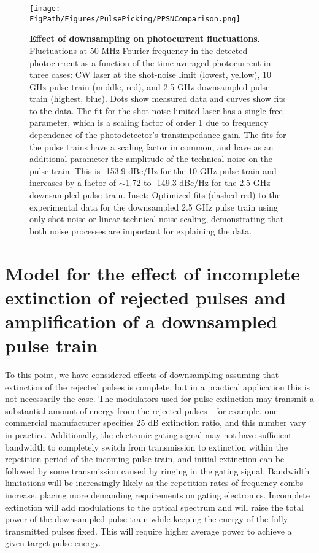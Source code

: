 \begin{figure}[htpb]
	\begin{center}
		\texttt{[image: \\FigPath/Figures/PulsePicking/PPSNComparison.png]}
	\end{center}
	\caption[Effect of downsampling on photocurrent fluctuations]{\textbf{Effect of downsampling on photocurrent fluctuations.} Fluctuations at 50 MHz Fourier frequency in the detected photocurrent as a function of the time-averaged photocurrent in three cases: CW laser at the shot-noise limit (lowest, yellow), 10 GHz pulse train (middle, red), and 2.5 GHz downsampled pulse train (highest, blue). Dots show measured data and curves show fits to the data. The fit for the shot-noise-limited laser has a single free parameter, which is a scaling factor of order 1 due to frequency dependence of the photodetector's transimpedance gain. The fits for the pulse trains have a scaling factor in common, and have as an additional parameter the amplitude of the technical noise on the pulse train. This is -153.9 dBc/Hz for the 10 GHz pulse train and increases by a factor of $\sim$1.72 to -149.3 dBc/Hz for the 2.5 GHz downsampled pulse train. Inset: Optimized fits (dashed red) to the experimental data for the downsampled 2.5 GHz pulse train using only shot noise or linear technical noise scaling, demonstrating that both noise processes are important for explaining the data. }
	\label{fig:PPSNComparison}
\end{figure} 

\section{Model for the effect of incomplete extinction of rejected pulses and amplification of a downsampled pulse train}\label{sec:PPAmplification}
To this point, we have considered effects of downsampling assuming that extinction of the rejected pulses is complete, but in a practical application this is not necessarily the case.  The modulators used for pulse extinction may transmit a substantial amount of energy from the rejected pulses---for example, one commercial manufacturer specifies 25 dB extinction ratio, and this number vary in practice. Additionally, the electronic gating signal may not have sufficient bandwidth to completely switch from transmission to extinction within the repetition period of the incoming pulse train, and initial extinction can be followed by some transmission caused by ringing in the gating signal. Bandwidth limitations will be increasingly likely as the repetition rates of frequency combs increase, placing more demanding requirements on gating electronics.  Incomplete extinction will add modulations to the optical spectrum and will raise the total power of the downsampled pulse train while keeping the energy of the fully-transmitted pulses fixed. This will require higher average power to achieve a given target pulse energy.

